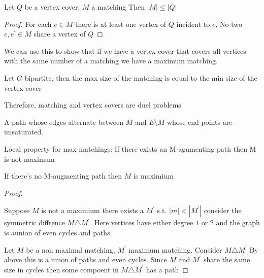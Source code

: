 
\begin{lemma}
	Let \(Q\) be a vertex cover, \(M\) a matching
	Then \(|M| \leq |Q|\) 
\end{lemma}
\begin{proof}
	For each \(e \in M\) there is at least one vertex of \(Q\) incident to \(e\). No two \(e, e^\prime \in M\) share a vertex of \(Q\)
\end{proof}

We can use this to show that if we have a vertex cover that covers all vertices with the same number of a matching we have a maximum matching.

\begin{theorem}[König]
	\label{thm:könig}
	Let \(G\) bipartite, then the max size of the matching is equal to the min size of the vertex cover
\end{theorem} 

Therefore, matching and vertex covers are duel problems

\begin{definition}
	\label{def:m-augmenting-path}
	A path whose edges alternate between \(M\) and \(E\setminus M\) whose end points are unsaturated.

\end{definition}  

Local property for max matchings: If there exists an M-agumenting path then M is not maximum

\begin{theorem}
	\label{thm:maximum matching}
	If there's no M-augmenting path then \(M\)  is maximium
\end{theorem}
\begin{proof}
	\begin{note}
		Suppose \(M\) is not a maximium there exists a \(M^\prime\) s.t. \(|m| < | M^\prime|\) consider the symmetric diffrence \(M \triangle M^\prime\). Here vertices have either degree \(1\) or \(2\) and the graph is aunion of even cycles and paths. 
	\end{note}
	Let \(M\) be a non maximal matching, \(M^\prime\) maximum matching. Consider \(M \triangle M^\prime\) By above this is a union of paths and even cycles. Since \(M\) and \(M^\prime\) share the same size in cycles then some compoent in \(M \triangle M^\prime\) has a path
\end{proof}



